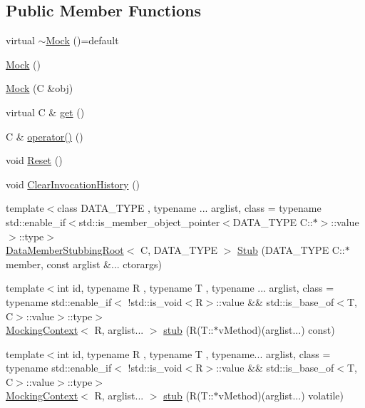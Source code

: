 \subsection*{Public Member Functions}
\begin{DoxyCompactItemize}
\item 
virtual \mbox{\hyperlink{classfakeit_1_1Mock_af5ecff29779ab75289c260d0a56705ab}{$\sim$\+Mock}} ()=default
\item 
\mbox{\hyperlink{classfakeit_1_1Mock_af7a86c609a2ee704ee09de6db066c7f4}{Mock}} ()
\item 
\mbox{\hyperlink{classfakeit_1_1Mock_aa474a0d6c7447608253a0fc306eb6ef5}{Mock}} (C \&obj)
\item 
virtual C \& \mbox{\hyperlink{classfakeit_1_1Mock_a139a126982e65ed43a69b21a3a8a6d35}{get}} ()
\item 
C \& \mbox{\hyperlink{classfakeit_1_1Mock_a128ca35e5c7648e0612f017cb7076498}{operator()}} ()
\item 
void \mbox{\hyperlink{classfakeit_1_1Mock_a69c66fc56c032205843b05d91f339a55}{Reset}} ()
\item 
void \mbox{\hyperlink{classfakeit_1_1Mock_ac9e21ef9c73c735287c7fd3dd110aafc}{Clear\+Invocation\+History}} ()
\item 
{\footnotesize template$<$class D\+A\+T\+A\+\_\+\+T\+Y\+PE , typename ... arglist, class  = typename std\+::enable\+\_\+if$<$std\+::is\+\_\+member\+\_\+object\+\_\+pointer$<$\+D\+A\+T\+A\+\_\+\+T\+Y\+P\+E C\+::$\ast$$>$\+::value$>$\+::type$>$ }\\\mbox{\hyperlink{classfakeit_1_1DataMemberStubbingRoot}{Data\+Member\+Stubbing\+Root}}$<$ C, D\+A\+T\+A\+\_\+\+T\+Y\+PE $>$ \mbox{\hyperlink{classfakeit_1_1Mock_ae210824251ca071933f8a651bbe56047}{Stub}} (D\+A\+T\+A\+\_\+\+T\+Y\+PE C\+::$\ast$member, const arglist \&... ctorargs)
\item 
{\footnotesize template$<$int id, typename R , typename T , typename ... arglist, class  = typename std\+::enable\+\_\+if$<$                !std\+::is\+\_\+void$<$\+R$>$\+::value \&\& std\+::is\+\_\+base\+\_\+of$<$\+T, C$>$\+::value$>$\+::type$>$ }\\\mbox{\hyperlink{classfakeit_1_1MockingContext}{Mocking\+Context}}$<$ R, arglist... $>$ \mbox{\hyperlink{classfakeit_1_1Mock_a7a8f38b58b068b35f263eee42d75c162}{stub}} (R(T\+::$\ast$v\+Method)(arglist...) const)
\item 
{\footnotesize template$<$int id, typename R , typename T , typename... arglist, class  = typename std\+::enable\+\_\+if$<$                !std\+::is\+\_\+void$<$\+R$>$\+::value \&\& std\+::is\+\_\+base\+\_\+of$<$\+T, C$>$\+::value$>$\+::type$>$ }\\\mbox{\hyperlink{classfakeit_1_1MockingContext}{Mocking\+Context}}$<$ R, arglist... $>$ \mbox{\hyperlink{classfakeit_1_1Mock_a6974858200b57469de78bf2a06d6fa02}{stub}} (R(T\+::$\ast$v\+Method)(arglist...) volatile)

\end{DoxyCompactItemize}

